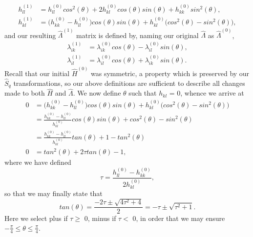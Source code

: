 \documentclass[11pt,a4paper]{article}
\begin{document}
{\begin{align}
h_{ll}^{(1)} &= h_{ll}^{(0)}cos^2(\theta) + 2h_{kl}^{(0)}cos(\theta)sin(\theta) + h_{kk}^{(0)}sin^2(\theta), \\
h_{kl}^{(1)} &= \big(h_{kk}^{(0)} - h_{ll}^{(0)}\big)cos(\theta)sin(\theta) + h_{kl}^{(0)}\big(cos^2(\theta) - sin^2(\theta)\big),
\end{align}
and our resulting $\hat{\Lambda}^{(1)}$ matrix is defined by, naming our original $\hat{\Lambda}$ as $\hat{\Lambda}^{(0)}$,
\begin{align}
\lambda_{ik}^{(1)} &= \lambda_{ik}^{(0)}cos(\theta) - \lambda_{il}^{(0)}sin(\theta), \\
\lambda_{il}^{(1)} &= \lambda_{il}^{(0)}cos(\theta) + \lambda_{ik}^{(0)}sin(\theta).
\end{align}
Recall that our initial $\hat{H}^{(0)}$ was symmetric, a property which is preserved by our $\hat{S}_q$ transformations, so our above definitions are sufficient to describe all changes made to both $\hat{H}$ and $\hat{\Lambda}$. We now define $\theta$ such that $h_{kl}$ = 0, whence we arrive at
\begin{align}
0 &= \big(h_{kk}^{(0)} - h_{ll}^{(0)}\big)cos(\theta)sin(\theta) + h_{kl}^{(0)}\big(cos^2(\theta) - sin^2(\theta)\big) \\
  &= \frac{h_{kk}^{(0)} - h_{ll}^{(0)}}{h_{kl}^{(0)}}cos(\theta)sin(\theta) + cos^2(\theta) - sin^2(\theta) \\
  &= \frac{h_{kk}^{(0)} - h_{ll}^{(0)}}{h_{kl}^{(0)}}tan(\theta) + 1 - tan^2(\theta) \\
0 &= tan^2(\theta) + 2\tau tan(\theta) - 1,
\end{align}
where we have defined
\begin{equation}
\tau = \frac{h_{ll}^{(0)} - h_{kk}^{(0)}}{2h_{kl}^{(0)}},
\end{equation}
so that we may finally state that
\begin{equation}
tan(\theta) = \frac{-2\tau \pm \sqrt{4\tau^2 + 4}}{2} = -\tau \pm \sqrt{\tau^2 + 1}.
\end{equation}
Here we select plus if $\tau \geq$ 0, minus if $\tau <$ 0, in order that we may ensure $-\frac{\pi}{4} \leq \theta \leq \frac{\pi}{4}$. 

}
\end{document}
